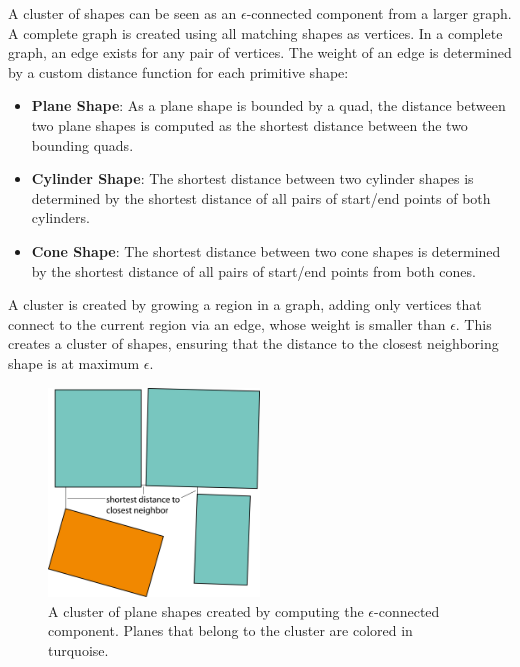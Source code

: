 A cluster of shapes can be seen as an $\epsilon$-connected component from a larger graph. A complete graph is created using all matching shapes as vertices. In a complete graph, an edge exists for any pair of vertices. The weight of an edge is determined by a custom distance function for each primitive shape:

\begin{itemize}
    \item \textbf{Plane Shape}: As a plane shape is bounded by a quad, the distance between two plane shapes is computed as the shortest distance between the two bounding quads.
    \item \textbf{Cylinder Shape}: The shortest distance between two cylinder shapes is determined by the shortest distance of all pairs of start/end points of both cylinders. 
  \item \textbf{Cone Shape}: The shortest distance between two cone shapes is determined by the shortest distance of all pairs of start/end points from both cones. 
\end{itemize}

A cluster is created by growing a region in a graph, adding only vertices that connect to the current region via an edge, whose weight is smaller than $\epsilon$. This creates a cluster of shapes, ensuring that the distance to the closest neighboring shape is at maximum $\epsilon$. 
\\
\begin{figure}
    \centering
    \includegraphics[width=0.5\textwidth]{Shape_Detection/regionGrowingPlanes.png}
    \caption[Exemplary $\epsilon$-connected plane cluster]
		{A cluster of plane shapes created by computing the $\epsilon$-connected component. Planes that belong to the cluster are colored in turquoise.}
    \label{fig:regionGrowingPlanes}
\end{figure}

